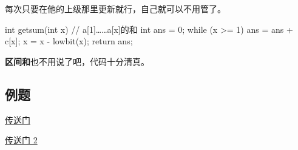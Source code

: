 每次只要在他的上级那里更新就行，自己就可以不用管了。

\begin{cppcode}
int getsum(int x)  // a[1]……a[x]的和
{
  int ans = 0;
  while (x >= 1) {
    ans = ans + c[x];
    x = x - lowbit(x);
  }
  return ans;
}
\end{cppcode}

\textbf{区间和}也不用说了吧，代码十分清真。

\subsection{例题}

\href{https://www.luogu.org/problemnew/show/P3374}{传送门}  

\href{https://www.luogu.org/problemnew/show/P3368}{传送门 2}
